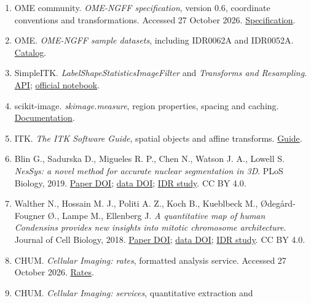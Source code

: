 \documentclass[10pt,a4paper]{article}
\providecommand{\tightlist}{\setlength{\itemsep}{0pt}\setlength{\parskip}{0pt}}
\begin{document}
\begin{enumerate}
\def\labelenumi{\arabic{enumi}.}
\tightlist
\item
  OME community. \emph{OME-NGFF specification}, version 0.6, coordinate
  conventions and transformations. Accessed 27 October 2026.
  \href{https://ngff-spec.readthedocs.io/en/latest/}{Specification}.
\item
  OME. \emph{OME-NGFF sample datasets}, including IDR0062A and IDR0052A.
  \href{https://idr.github.io/ome-ngff-samples/}{Catalog}.
\item
  SimpleITK. \emph{LabelShapeStatisticsImageFilter} and \emph{Transforms
  and Resampling}.
  \href{https://simpleitk.org/doxygen/latest/html/classitk_1_1simple_1_1LabelShapeStatisticsImageFilter.html}{API};
  \href{https://insightsoftwareconsortium.github.io/SimpleITK-Notebooks/Python_html/21_Transforms_and_Resampling.html}{official
  notebook}.
\item
  scikit-image. \emph{skimage.measure}, region properties, spacing and
  caching.
  \href{https://scikit-image.org/docs/stable/api/skimage.measure.html}{Documentation}.
\item
  ITK. \emph{The ITK Software Guide}, spatial objects and affine
  transforms.
  \href{https://itk.org/ITKSoftwareGuide/html/Book1/ITKSoftwareGuide-Book1ch5.html}{Guide}.
\item
  Blin G., Sadurska D., Migueles R. P., Chen N., Watson J. A., Lowell S.
  \emph{NesSys: a novel method for accurate nuclear segmentation in 3D}.
  PLoS Biology, 2019.
  \href{https://doi.org/10.1371/journal.pbio.3000388}{Paper DOI};
  \href{https://doi.org/10.17867/10000125}{data DOI};
  \href{https://idr.openmicroscopy.org/study/idr0062/}{IDR study}. CC BY
  4.0.
\item
  Walther N., Hossain M. J., Politi A. Z., Koch B., Kueblbeck M.,
  Ødegård-Fougner Ø., Lampe M., Ellenberg J. \emph{A quantitative map of
  human Condensins provides new insights into mitotic chromosome
  architecture}. Journal of Cell Biology, 2018.
  \href{https://doi.org/10.1083/jcb.201801048}{Paper DOI};
  \href{https://doi.org/10.17867/10000123}{data DOI};
  \href{https://idr.openmicroscopy.org/study/idr0052/}{IDR study}. CC BY
  4.0.
\item
  CHUM. \emph{Cellular Imaging: rates}, formatted analysis service.
  Accessed 27 October 2026.
  \href{https://www.chumontreal.qc.ca/en/crchum/core-facilities-and-services/cellular-imaging/rates}{Rates}.
\item
  CHUM. \emph{Cellular Imaging: services}, quantitative extraction and

\end{enumerate}
\end{document}
